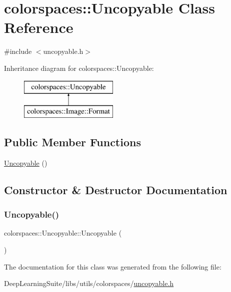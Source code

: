 \hypertarget{classcolorspaces_1_1_uncopyable}{}\section{colorspaces\+:\+:Uncopyable Class Reference}
\label{classcolorspaces_1_1_uncopyable}


{\ttfamily \#include $<$uncopyable.\+h$>$}

Inheritance diagram for colorspaces\+:\+:Uncopyable\+:\begin{figure}[H]
\begin{center}
\leavevmode
\includegraphics[height=2.000000cm]{classcolorspaces_1_1_uncopyable}
\end{center}
\end{figure}
\subsection*{Public Member Functions}
\begin{DoxyCompactItemize}
\item 
\hyperlink{classcolorspaces_1_1_uncopyable_a9269ace107d3f5f8fe3e164af452e775}{Uncopyable} ()
\end{DoxyCompactItemize}


\subsection{Constructor \& Destructor Documentation}
\mbox{\label{classcolorspaces_1_1_uncopyable_a9269ace107d3f5f8fe3e164af452e775}} 
\subsubsection{\texorpdfstring{Uncopyable()}{Uncopyable()}}
{\footnotesize\ttfamily colorspaces\+::\+Uncopyable\+::\+Uncopyable (\begin{DoxyParamCaption}{ }\end{DoxyParamCaption})\hspace{0.3cm}{\ttfamily [inline]}}



The documentation for this class was generated from the following file\+:\begin{DoxyCompactItemize}
\item 
Deep\+Learning\+Suite/libs/utils/colorspaces/\hyperlink{uncopyable_8h}{uncopyable.\+h}\end{DoxyCompactItemize}
